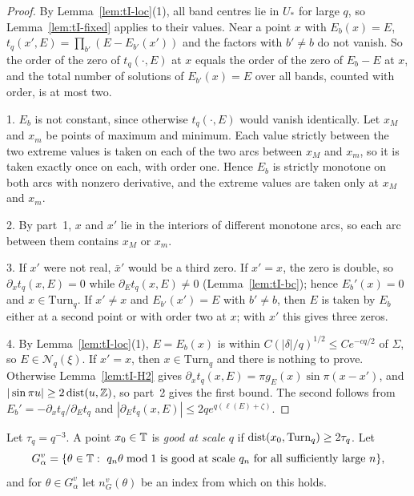 \begin{proof}
By Lemma~\ref{lem:tI-loc}(1), all band centres lie in $U_*$ for large $q$, so Lemma~\ref{lem:tI-fixed} applies to their values. Near a point $x$ with $E_b(x)=E$, $t_q(x',E)=\prod_{b'}(E-E_{b'}(x'))$ and the factors with $b'\ne b$ do not vanish. So the order of the zero of $t_q(\cdot,E)$ at $x$ equals the order of the zero of $E_b-E$ at $x$, and the total number of solutions of $E_{b'}(x)=E$ over all bands, counted with order, is at most two.

1. $E_b$ is not constant, since otherwise $t_q(\cdot,E)$ would vanish identically. Let $x_M$ and $x_m$ be points of maximum and minimum. Each value strictly between the two extreme values is taken on each of the two arcs between $x_M$ and $x_m$, so it is taken exactly once on each, with order one. Hence $E_b$ is strictly monotone on both arcs with nonzero derivative, and the extreme values are taken only at $x_M$ and $x_m$.

2. By part~1, $x$ and $x'$ lie in the interiors of different monotone arcs, so each arc between them contains $x_M$ or $x_m$.

3. If $x'$ were not real, $\bar x'$ would be a third zero. If $x'=x$, the zero is double, so $\partial_xt_q(x,E)=0$ while $\partial_Et_q(x,E)\ne0$ (Lemma~\ref{lem:tI-bc}); hence $E_b'(x)=0$ and $x\in\mathrm{Turn}_q$. If $x'\ne x$ and $E_{b'}(x')=E$ with $b'\ne b$, then $E$ is taken by $E_b$ either at a second point or with order two at $x$; with $x'$ this gives three zeros.

4. By Lemma~\ref{lem:tI-loc}(1), $E=E_b(x)$ is within $C(|\delta|/q)^{1/2}\le Ce^{-cq/2}$ of $\Sigma$, so $E\in\mathcal N_q(\xi)$. If $x'=x$, then $x\in\mathrm{Turn}_q$ and there is nothing to prove. Otherwise Lemma~\ref{lem:tI-H2} gives $\partial_xt_q(x,E)=\pi g_E(x)\sin\pi(x-x')$, and $|\sin\pi u|\ge2\operatorname{dist}(u,\mathbb Z)$, so part~2 gives the first bound. The second follows from $E_b'=-\partial_xt_q/\partial_Et_q$ and $|\partial_Et_q(x,E)|\le2qe^{q(\ell(E)+\zeta)}$.
\end{proof}

\begin{definition}\label{def:tI-good}
Let $\tau_q=q^{-3}$. A point $x_0\in\mathbb T$ is \emph{good at scale $q$} if $\operatorname{dist}(x_0,\mathrm{Turn}_q)\ge2\tau_q$. Let
\[
G^v_\alpha=\{\theta\in\T:\ q_n\theta\bmod1\text{ is good at scale }q_n\text{ for all sufficiently large }n\},
\]
and for $\theta\in G^v_\alpha$ let $n_G^v(\theta)$ be an index from which on this holds.
\end{definition}

